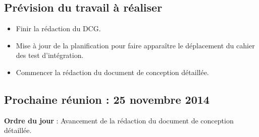 \documentclass[12pt,a4paper]{article}
\begin{document}
\subsection*{Prévision du travail à réaliser}

\begin{itemize}[label = $\ast$]

\item Finir la rédaction du DCG.
\item Mise à jour de la planification pour faire apparaître le déplacement du cahier des test d'intégration.\\
\item Commencer la rédaction du document de conception détaillée.
\end{itemize}

\subsection*{Prochaine réunion : 25 novembre 2014}

\textbf{Ordre du jour} : Avancement de la rédaction du document de conception détaillée.\\
\end{document}
